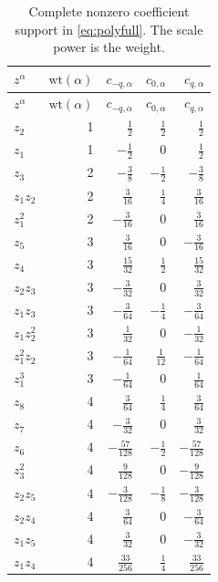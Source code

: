 \documentclass[11pt,a4paper]{article}
\numberwithin{equation}{section}
\theoremstyle{definition}
\theoremstyle{remark}
\begin{document}
\begingroup
\renewcommand{\arraystretch}{1.7}
\begin{longtable}{@{}lrrrr@{}}
\caption{Complete nonzero coefficient support in \eqref{eq:polyfull}. The scale power is the weight.}\label{tab:responsecoeff}\\
\toprule
$z^\alpha$ & $\mathrm{wt}(\alpha)$ & $c_{-q,\alpha}$ & $c_{0,\alpha}$ & $c_{q,\alpha}$ \\
\midrule
\endfirsthead
\toprule
$z^\alpha$ & $\mathrm{wt}(\alpha)$ & $c_{-q,\alpha}$ & $c_{0,\alpha}$ & $c_{q,\alpha}$ \\
\midrule
\endhead
$z_{2}$ & 1 & $\frac{1}{2}$ & $\frac{1}{2}$ & $\frac{1}{2}$ \\
$z_{1}$ & 1 & $-\frac{1}{2}$ & $0$ & $\frac{1}{2}$ \\
$z_{3}$ & 2 & $-\frac{3}{8}$ & $-\frac{1}{2}$ & $-\frac{3}{8}$ \\
$z_{1}z_{2}$ & 2 & $\frac{3}{16}$ & $\frac{1}{4}$ & $\frac{3}{16}$ \\
$z_{1}^{2}$ & 2 & $-\frac{3}{16}$ & $0$ & $\frac{3}{16}$ \\
$z_{5}$ & 3 & $\frac{3}{16}$ & $0$ & $-\frac{3}{16}$ \\
$z_{4}$ & 3 & $\frac{15}{32}$ & $\frac{1}{2}$ & $\frac{15}{32}$ \\
$z_{2}z_{3}$ & 3 & $-\frac{3}{32}$ & $0$ & $\frac{3}{32}$ \\
$z_{1}z_{3}$ & 3 & $-\frac{3}{64}$ & $-\frac{1}{4}$ & $-\frac{3}{64}$ \\
$z_{1}z_{2}^{2}$ & 3 & $\frac{1}{32}$ & $0$ & $-\frac{1}{32}$ \\
$z_{1}^{2}z_{2}$ & 3 & $-\frac{1}{64}$ & $\frac{1}{12}$ & $-\frac{1}{64}$ \\
$z_{1}^{3}$ & 3 & $-\frac{1}{64}$ & $0$ & $\frac{1}{64}$ \\
$z_{8}$ & 4 & $\frac{3}{64}$ & $\frac{1}{4}$ & $\frac{3}{64}$ \\
$z_{7}$ & 4 & $-\frac{3}{32}$ & $0$ & $\frac{3}{32}$ \\
$z_{6}$ & 4 & $-\frac{57}{128}$ & $-\frac{1}{2}$ & $-\frac{57}{128}$ \\
$z_{3}^{2}$ & 4 & $\frac{9}{128}$ & $0$ & $-\frac{9}{128}$ \\
$z_{2}z_{5}$ & 4 & $-\frac{3}{128}$ & $-\frac{1}{8}$ & $-\frac{3}{128}$ \\
$z_{2}z_{4}$ & 4 & $\frac{3}{64}$ & $0$ & $-\frac{3}{64}$ \\
$z_{1}z_{5}$ & 4 & $\frac{3}{32}$ & $0$ & $-\frac{3}{32}$ \\
$z_{1}z_{4}$ & 4 & $\frac{33}{256}$ & $\frac{1}{4}$ & $\frac{33}{256}$ \\

\end{longtable}
\end{document}
